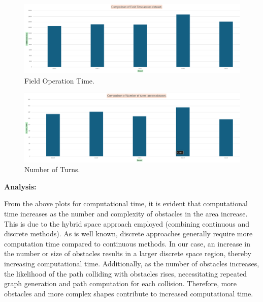 \begin{figure}[H]
    \centering
    \includegraphics[width=\textwidth]{Images/plots/obs/Field time.png}
    \caption{Field Operation Time.}
    \label{fig:Field_operation_time_obs}
\end{figure}

\begin{figure}[H]
    \centering
    \includegraphics[width=\textwidth]{Images/plots/obs/Number of turns.png}
    \caption{Number of Turns.}
    \label{fig:number_of_turns_obs}
\end{figure}


\textbf{Analysis: }

From the above plots for computational time, it is evident that computational time increases as the number and complexity of obstacles in the area increase. This is due to the hybrid space approach employed (combining continuous and discrete methods). As is well known, discrete approaches generally require more computation time compared to continuous methods. In our case, an increase in the number or size of obstacles results in a larger discrete space region, thereby increasing computational time. Additionally, as the number of obstacles increases, the likelihood of the path colliding with obstacles rises, necessitating repeated graph generation and path computation for each collision. Therefore, more obstacles and more complex shapes contribute to increased computational time.


\vspace{3mm}

